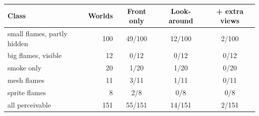 \begin{tabular}{@{}lrccc@{}}
\toprule
Class & Worlds & Front only & Look-around & + extra views \\
\midrule
small flames, partly hidden & 100 & 49/100 & 12/100 & 2/100 \\
big flames, visible & 12 & 0/12 & 0/12 & 0/12 \\
smoke only & 20 & 1/20 & 1/20 & 0/20 \\
mesh flames & 11 & 3/11 & 1/11 & 0/11 \\
sprite flames & 8 & 2/8 & 0/8 & 0/8 \\
\midrule
all perceivable & 151 & 55/151 & 14/151 & 2/151 \\
\bottomrule
\end{tabular}
